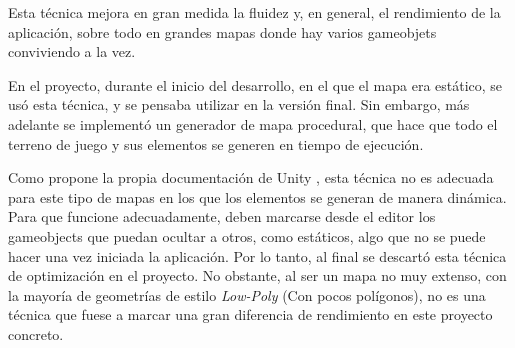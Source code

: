 Esta técnica mejora en gran medida la fluidez y, en general, el rendimiento de la aplicación, sobre todo en grandes mapas donde hay varios gameobjets conviviendo a la vez.

En el proyecto, durante el inicio del desarrollo, en el que el mapa era estático, se usó esta técnica, y se pensaba utilizar en la versión final. Sin embargo, más adelante se implementó un generador de mapa procedural, que hace que todo el terreno de juego y sus elementos se generen en tiempo de ejecución. 

Como propone la propia documentación de Unity \cite{wiki:OclussionCulling}, esta técnica no es adecuada para este tipo de mapas en los que los elementos se generan de manera dinámica. Para que funcione adecuadamente, deben marcarse desde el editor los gameobjects que puedan ocultar a otros, como estáticos, algo que no se puede hacer una vez iniciada la aplicación.
Por lo tanto, al final se descartó esta técnica de optimización en el proyecto. No obstante, al ser un mapa no muy extenso, con la mayoría de geometrías de estilo \textit{Low-Poly} (Con pocos polígonos), no es una técnica que fuese a marcar una gran diferencia de rendimiento en este proyecto concreto.
